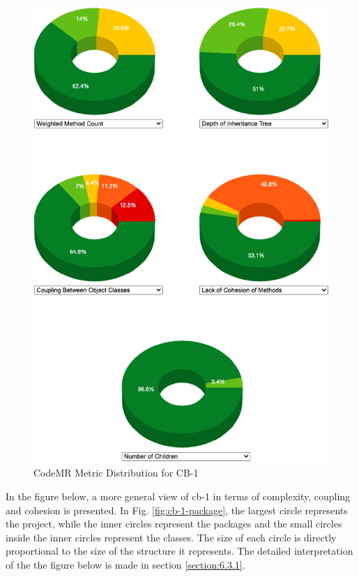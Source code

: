 \begin{figure}[ht!]
    \centering
    \includegraphics[scale=1]{figures/cb-1-donuts.png}
    \caption{CodeMR Metric Distribution for CB-1}
    \label{fig:cb-1-donuts}
\end{figure}
\FloatBarrier

In the figure below, a more general view of cb-1 in terms of complexity, coupling and cohesion is presented. In Fig. \ref{fig:cb-1-package}, the largest circle represents the project, while the inner circles represent the packages and the small circles inside the inner circles represent the classes. The size of each circle is directly proportional to the size of the structure it represents. The detailed interpretation of the  the figure below is made in section \ref{section:6.3.1}.

